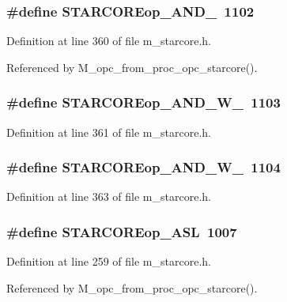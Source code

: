 \subsubsection{\setlength{\rightskip}{0pt plus 5cm}\#define STARCOREop\_\-AND\_~1102}\label{m__starcore_8h_f314091c524f34bc86b90f4081fa19dd}




Definition at line 360 of file m\_\-starcore.h.

Referenced by M\_\-opc\_\-from\_\-proc\_\-opc\_\-starcore().
\subsubsection{\setlength{\rightskip}{0pt plus 5cm}\#define STARCOREop\_\-AND\_\-W\_~1103}\label{m__starcore_8h_924b99255967a438b89ea4707ee9a5ea}




Definition at line 361 of file m\_\-starcore.h.
\subsubsection{\setlength{\rightskip}{0pt plus 5cm}\#define STARCOREop\_\-AND\_\-W\_~1104}\label{m__starcore_8h_309cefd60804cc21693fe83f85b9ee35}




Definition at line 363 of file m\_\-starcore.h.
\subsubsection{\setlength{\rightskip}{0pt plus 5cm}\#define STARCOREop\_\-ASL~1007}\label{m__starcore_8h_9641eeac14ac6f8073a6ec2287d10917}




Definition at line 259 of file m\_\-starcore.h.

Referenced by M\_\-opc\_\-from\_\-proc\_\-opc\_\-starcore().
